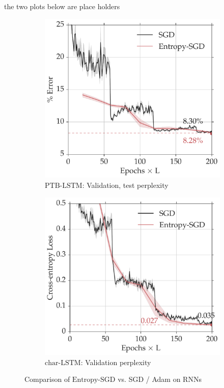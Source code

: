 \documentclass[10pt]{article}
\newcommand{\entropysgd}{\mathrm{Entropy}\textrm{-}\mathrm{SGD}}
\newcommand{\charlstm}{\textrm{char-LSTM}}
\newcommand{\ptblstm}{\textrm{PTB-LSTM}}
\newcommand{\todo}[1]{{\color{gray}#1}\marginpar{\tiny\noindent{\raggedright{\color{blue}[TODO]}}}}
\begin{document}
\todo{the two plots below are place holders}
\begin{figure}[htp!]
\centering
    \begin{subfigure}[b]{0.4\textwidth}
        \centering
        \includegraphics[width=\textwidth]{allcnn_valid.pdf}
        \caption{\small $\ptblstm$: Validation, test perplexity}
        \label{fig:ptb_valid}
    \end{subfigure}
    \hspace{0.2in}
    \begin{subfigure}[b]{0.4\textwidth}
        \centering
        \includegraphics[width=1.02\textwidth]{allcnn_loss.pdf}
        \caption{\small $\charlstm$: Validation perplexity}
        \label{fig:char_valid}
    \end{subfigure}
\caption{\small Comparison of $\entropysgd$ vs. SGD / Adam on RNNs}
\label{fig:rnn}
\end{figure}
\end{document}
